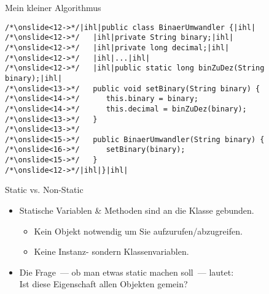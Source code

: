 {\begin{frame}[fragile,c]{Mein kleiner Algorithmus}
\begin{onlyenv}
\begin{verbatim}
/*\onslide<12->*/|ihl|public class BinaerUmwandler {|ihl|
/*\onslide<12->*/   |ihl|private String binary;|ihl|
/*\onslide<12->*/   |ihl|private long decimal;|ihl|
/*\onslide<12->*/   |ihl|...|ihl|
/*\onslide<12->*/   |ihl|public static long binZuDez(String binary);|ihl|
/*\onslide<13->*/   public void setBinary(String binary) {
/*\onslide<14->*/      this.binary = binary;
/*\onslide<14->*/      this.decimal = binZuDez(binary);
/*\onslide<13->*/   }
/*\onslide<13->*/
/*\onslide<15->*/   public BinaerUmwandler(String binary) {
/*\onslide<16->*/      setBinary(binary);
/*\onslide<15->*/   }
/*\onslide<12->*/|ihl|}|ihl|
\end{verbatim}
\end{onlyenv}
\end{frame}
\SidebarReset


\begin{frame}[c]{Static vs. Non-Static}
   \begin{itemize}[<+(1)->]
      \itemsep11pt
      \item Statische Variablen \& Methoden sind an die Klasse gebunden. \begin{itemize}
         \item Kein Objekt notwendig um Sie aufzurufen/abzugreifen.
         \item Keine Instanz- sondern Klassenvariablen.
      \end{itemize}
      \item Die Frage~--- ob man etwas static machen soll~--- lautet:\\Ist diese Eigenschaft allen Objekten gemein?
   \end{itemize}
\end{frame}


}
